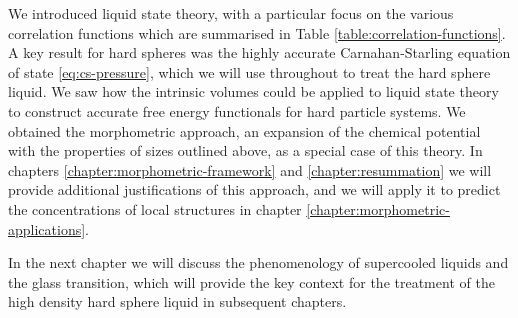 \documentclass[11pt,twoside]{report}
\def\includebibliography{}
\begin{document}
We introduced liquid state theory, with a particular focus on the various correlation functions which are summarised in Table \ref{table:correlation-functions}.
A key result for hard spheres was the highly accurate Carnahan-Starling equation of state \eqref{eq:cs-pressure}, which we will use throughout to treat the hard sphere liquid.
We saw how the intrinsic volumes could be applied to liquid state theory to construct accurate free energy functionals for hard particle systems.
We obtained the morphometric approach, an expansion of the chemical potential with the properties of sizes outlined above, as a special case of this theory.
In chapters \ref{chapter:morphometric-framework} and \ref{chapter:resummation} we will provide additional justifications of this approach, and we will apply it to predict the concentrations of local structures in chapter \ref{chapter:morphometric-applications}.

In the next chapter we will discuss the phenomenology of supercooled liquids and the glass transition, which will provide the key context for the treatment of the high density hard sphere liquid in subsequent chapters.

\ifdefined\includebibliography
  \printbibliography
\fi
\end{document}
